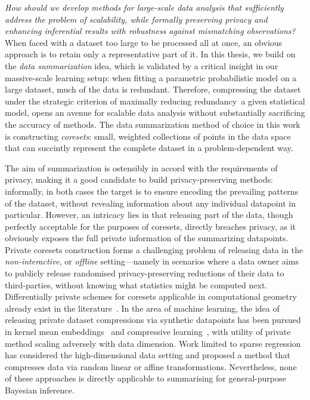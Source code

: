 \emph{How should we develop methods for large-scale data analysis that sufficiently address the problem of scalability, while formally preserving privacy and enhancing inferential results with robustness against mismatching observations?} When faced with a dataset too large to be processed all at once, an obvious approach is to retain only a representative part of it. In this thesis, we build on the \emph{data summarization} idea, which is validated by a critical insight in our massive-scale learning setup: when fitting a parametric probabilistic model on a large dataset, much of the data is redundant. Therefore, compressing the dataset under the strategic criterion of maximally reducing redundancy~\wrt a given statistical model, opens an avenue for scalable data analysis without substantially sacrificing the accuracy of methods. The data summarization method of choice in this work is constructing \emph{coresets}: small, weighted collections of points in the data space that can succintly represent the complete dataset in a problem-dependent way. 

The aim of summarization is ostensibly in accord with the requirements of privacy, making it a good candidate to build privacy-preserving methods: informally, in both cases the target is to ensure encoding the prevailing patterns of the dataset, without revealing information about any individual datapoint in particular. However, an intricacy lies in that releasing part of the data, though perfectly acceptable for the purposes of coresets, directly breaches privacy, as it obviously exposes the full private information of the summarizing datapoints. Private coresets construction forms a challenging problem of releasing data in the \emph{non-interactive}, or \emph{offline} setting---namely in scenarios where a data owner aims to publicly release randomised privacy-preserving reductions of their data to third-parties, without knowing what statistics might be computed next. Differentially private schemes for coresets applicable in computational geometry already exist in the literature~\citep{feldman09,feldman17}. In the area of machine learning, the idea of releasing private dataset compressions via synthetic datapoints has been pursued in kernel mean embeddings~\citep{balog18} and compressive learning~\citep{schellekens19}, with utility of private method scaling adversely with data dimension. Work limited to sparse regression~\citep{zhou08} has considered the high-dimensional data setting and proposed a method that compresses data via random linear or affine transformations. Nevertheless, none of these approaches is directly applicable to summarising for general-purpose Bayesian inference. 

